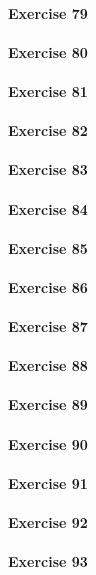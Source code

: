 \paragraph{Exercise 79}
\paragraph{Exercise 80}
\paragraph{Exercise 81}
\paragraph{Exercise 82}
\paragraph{Exercise 83}
\paragraph{Exercise 84}
\paragraph{Exercise 85}
\paragraph{Exercise 86}
\paragraph{Exercise 87}
\paragraph{Exercise 88}
\paragraph{Exercise 89}
\paragraph{Exercise 90}
\paragraph{Exercise 91}
\paragraph{Exercise 92}
\paragraph{Exercise 93}

